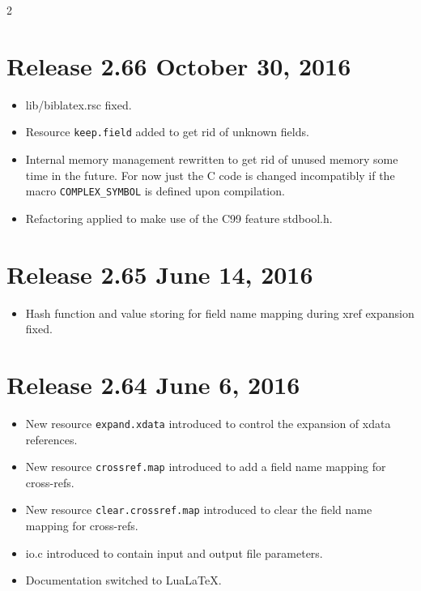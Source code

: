 \documentclass[11pt,a4paper]{scrartcl}
\newcommand\rsc[1]{\texttt{#1}}
\newcommand\File[1]{\textsf{#1}}
\newenvironment{Releases}{\begin{multicols}2\RaggedRight}{\end{multicols}}
\newenvironment{Release}[2]{%
  \def\tmp{#2}%
  \section*{Release #1 \ifx\tmp\empty\else{\normalsize[#2]}\fi}
  \begin{itemize}
}{\end{itemize}}
\newenvironment{Fix}[1]{\item }{}
\newenvironment{New}[1]{\item }{}
\newenvironment{Update}[1]{\item }{}
\begin{document}
\begin{Releases}
 \begin{Release}{2.66}{October 30, 2016}
  \begin{Fix}{gene}
    \File{lib/biblatex.rsc} fixed.
  \end{Fix}
  \begin{New}{gene}
    Resource \rsc{keep.field} added to get rid of unknown fields.
  \end{New}
  \begin{Update}{gene}
    Internal memory management rewritten to get rid of unused memory
    some time in the future. For now just the C code is changed
    incompatibly if the macro \verb|COMPLEX_SYMBOL| is defined upon
    compilation.
  \end{Update}
  \begin{Update}{gene}
    Refactoring applied to make use of the C99 feature
    \File{stdbool.h}.
  \end{Update}
 \end{Release}

 \begin{Release}{2.65}{June 14, 2016}
  \begin{Fix}{gene}
    Hash function and value storing for field name mapping during xref
    expansion fixed.
  \end{Fix}
 \end{Release}

 \begin{Release}{2.64}{June 6, 2016}
  \begin{New}{gene}
    New resource \rsc{expand.xdata} introduced to control the
    expansion of xdata references.
  \end{New}
  \begin{New}{gene}
    New resource \rsc{crossref.map} introduced to add a field name
    mapping for cross-refs.
  \end{New}
  \begin{New}{gene}
    New resource \rsc{clear.crossref.map} introduced to clear the
    field name mapping for cross-refs.
  \end{New}
  \begin{Update}{gene}
    \File{io.c} introduced to contain input and output file parameters.
  \end{Update}
  \begin{Update}{gene}
    Documentation switched to Lua\LaTeX.
  \end{Update}
 \end{Release}


\end{Releases}
\end{document}
